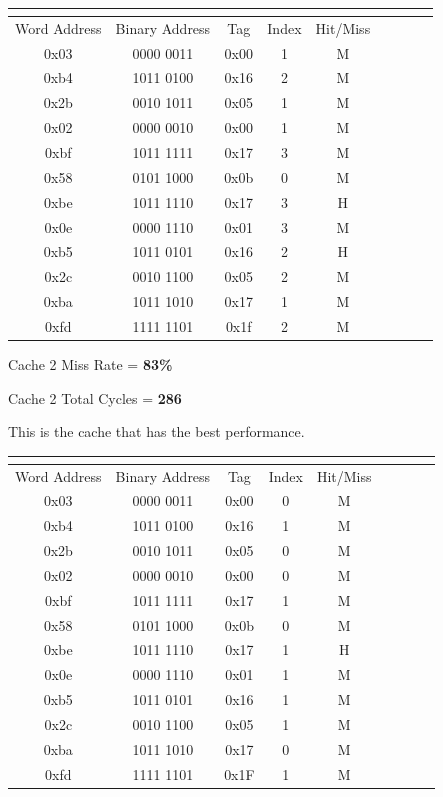\documentclass[11pt]{article}
\begin{document}
		\begin{center}
		\begin{tabular}{|c|c|c|c|c|c|c|c|c|}
			\hline
			\multicolumn{5}{|c|}{\text{Cache 2}}\\
			\hline
			Word Address & Binary Address & Tag & Index & Hit/Miss\\
			\hline
			0x03 & 0000 0011 & 0x00 & 1 & M\\
			\hline
			0xb4 & 1011 0100 & 0x16 & 2 & M\\
			\hline
			0x2b & 0010 1011 & 0x05 & 1 & M\\
			\hline
			0x02 & 0000 0010 & 0x00 & 1 & M\\
			\hline
			0xbf & 1011 1111 & 0x17 & 3 & M\\
			\hline
			0x58 & 0101 1000 & 0x0b & 0 & M\\
			\hline
			0xbe & 1011 1110 & 0x17 & 3 & H\\
			\hline
			0x0e & 0000 1110 & 0x01 & 3 & M\\
			\hline
			0xb5 & 1011 0101 & 0x16 & 2 & H\\
			\hline
			0x2c & 0010 1100 & 0x05 & 2 & M\\
			\hline
			0xba & 1011 1010 & 0x17 & 1 & M\\
			\hline
			0xfd & 1111 1101 & 0x1f & 2 & M\\
			\hline
		\end{tabular}
		\end{center}\par
    		Cache 2 Miss Rate = \textbf{83\%}\par
		Cache 2 Total Cycles = \textbf{286}\par
		This is the cache that has the best performance.\par
		\begin{center}
		\begin{tabular}{|c|c|c|c|c|c|c|c|c|}
			\hline
			\multicolumn{5}{|c|}{\text{Cache 3}}\\
			\hline
			Word Address & Binary Address & Tag & Index & Hit/Miss\\
			\hline
			0x03 & 0000 0011 & 0x00 & 0 & M\\
			\hline
			0xb4 & 1011 0100 & 0x16 & 1 & M\\
			\hline
			0x2b & 0010 1011 & 0x05 & 0 & M\\
			\hline
			0x02 & 0000 0010 & 0x00 & 0 & M\\
			\hline
			0xbf & 1011 1111 & 0x17 & 1 & M\\
			\hline
			0x58 & 0101 1000 & 0x0b & 0 & M\\
			\hline
			0xbe & 1011 1110 & 0x17 & 1 & H\\
			\hline
			0x0e & 0000 1110 & 0x01 & 1 & M\\
			\hline
			0xb5 & 1011 0101 & 0x16 & 1 & M\\
			\hline
			0x2c & 0010 1100 & 0x05 & 1 & M\\
			\hline
			0xba & 1011 1010 & 0x17 & 0 & M\\
			\hline
			0xfd & 1111 1101 & 0x1F & 1 & M\\
			\hline
		\end{tabular}
		\end{center}\par
\end{document}
